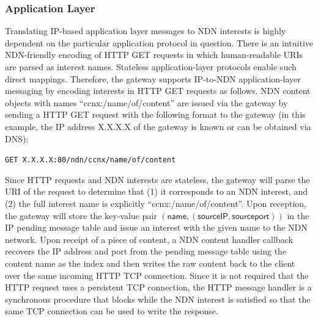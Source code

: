 \subsubsection{Application Layer}
Translating IP-based application layer messages to NDN interests is highly dependent on the particular application protocol in question. There is an intuitive NDN-friendly encoding of HTTP GET requests in which human-readable URIs are parsed as interest names. Stateless application-layer protocols enable such direct mappings. Therefore, the gateway supports IP-to-NDN application-layer messaging by encoding interests in HTTP GET requests as follows. NDN content objects with names ``ccnx:/name/of/content'' are issued via the gateway by sending a HTTP GET request with the following format to the gateway (in this example, the IP address X.X.X.X of the gateway is known or can be obtained via DNS):
\begin{center}
{\tt GET X.X.X.X:80/ndn/ccnx/name/of/content}
\end{center}
Since HTTP requests and NDN interests are stateless, the gateway will parse the URI of the request to determine that (1) it corresponds to an NDN interest, and (2) the full interest name is explicitly ``ccnx:/name/of/content''. Upon reception, the gateway will store the key-value pair $(\mathsf{name}, (\mathsf{source IP}, \mathsf{source port}))$ in the IP pending message table and issue an interest with the given name to the NDN network. Upon receipt of a piece of content, a NDN content handler callback recovers the IP address and port from the pending message table using the content name as the index and then writes the raw content back to the client over the same incoming HTTP TCP connection. Since it is not required that the HTTP request uses a persistent TCP connection, the HTTP message handler is a synchronous procedure that blocks while the NDN interest is satisfied so that the same TCP connection can be used to write the response. 

